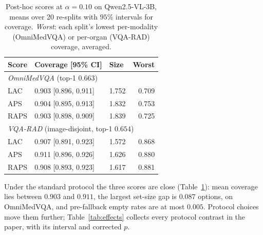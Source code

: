 \documentclass[a4paper,conference]{IEEEtran}
\newcommand{\rtag}[1]{}
\begin{document}
\begin{table}[tb]
\caption{Post-hoc scores at $\alpha=0.10$ on Qwen2.5-VL-3B, means over 20
re-splits with $95\%$ intervals for coverage. \emph{Worst}: each split's lowest
per-modality (OmniMedVQA) or per-organ (VQA-RAD) coverage, averaged.}
\label{tab:main}
\centering
\footnotesize
\begin{tabular}{lllr}
\toprule
Score & Coverage [95\% CI] & Size & Worst \\
\midrule
\multicolumn{4}{l}{\emph{OmniMedVQA} (top-1 $0.663$)}\\
LAC  & 0.903 [0.896, 0.911] & 1.752 & 0.709 \\
APS  & 0.904 [0.895, 0.913] & 1.832 & 0.753 \\
RAPS & 0.903 [0.898, 0.909] & 1.839 & 0.725 \\
\midrule
\multicolumn{4}{l}{\emph{VQA-RAD} (image-disjoint, top-1 $0.654$)}\\
LAC  & 0.907 [0.891, 0.923] & 1.572 & 0.868 \\
APS  & 0.911 [0.896, 0.926] & 1.626 & 0.880 \\
RAPS & 0.908 [0.893, 0.923] & 1.617 & 0.881 \\
\bottomrule
\end{tabular}
\end{table}

Under the standard protocol the three scores are close (Table~\ref{tab:main}):
mean coverage lies between $0.903$ and $0.911$, the largest set-size gap is
$0.087$ options, on OmniMedVQA, and pre-fallback empty rates are at most
$0.005$. Protocol choices move them further; Table~\ref{tab:effects} collects
every protocol contrast in the paper, with its interval and corrected $p$.\rtag{R1.5, R2.4}
\end{document}
